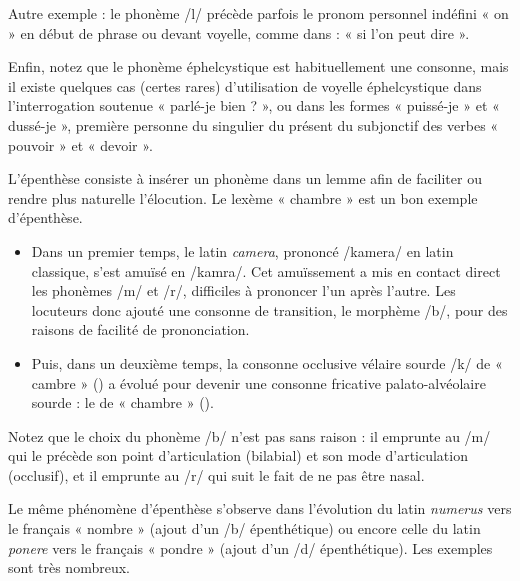 Autre exemple : le phonème /l/ précède parfois le pronom personnel indéfini « on » en début de phrase ou devant voyelle, comme dans : « si l’on peut dire ».

Enfin, notez que le phonème éphelcystique est habituellement une consonne, mais il existe quelques cas (certes rares) d’utilisation de voyelle éphelcystique dans l’interrogation soutenue « parlé-je bien ? », ou dans les formes « puissé-je » et « dussé-je », première personne du singulier du présent du subjonctif des verbes « pouvoir » et « devoir ».

L’épenthèse consiste à insérer un phonème dans un lemme afin de faciliter ou rendre plus naturelle l’élocution. Le lexème « chambre » est un bon exemple d’épenthèse.
\begin{itemize}
\item Dans un premier temps, le latin \textit{camera}, prononcé /kamera/ en latin classique, s’est amuïsé en /kamra/. Cet amuïssement a mis en contact direct les phonèmes /m/ et /r/, difficiles à prononcer l’un après l’autre. Les locuteurs donc ajouté une consonne de transition, le morphème /b/, pour des raisons de facilité de prononciation.
\item Puis, dans un deuxième temps, la consonne occlusive vélaire sourde /k/ de « cambre » () a évolué pour devenir une consonne fricative palato-alvéolaire sourde : le  de « chambre » ().
\end{itemize}
Notez que le choix du phonème /b/ n’est pas sans raison : il emprunte au /m/ qui le précède son point d’articulation (bilabial) et son mode d’articulation (occlusif), et il emprunte au /r/ qui suit le fait de ne pas être nasal.

Le même phénomène d’épenthèse s’observe dans l’évolution du latin \textit{numerus} vers le français « nombre » (ajout d’un /b/ épenthétique) ou encore celle du latin \textit{ponere} vers le français « pondre » (ajout d’un /d/ épenthétique). Les exemples sont très nombreux.

